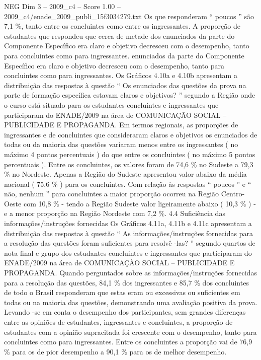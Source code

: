 \begin{textsample}{NEG Dim 3 – 2009\_c4 – Score 1.00 – 2009\_c4/enade\_2009\_publi\_15f3034279.txt}
Os que responderam “ poucos ” são 7,1 \%, tanto entre os concluintes como entre os ingressantes.
A proporção de estudantes que respondeu que cerca de metade dos enunciados da parte do Componente Específico era claro e objetivo decresceu com o desempenho, tanto para concluintes como para ingressantes. enunciados da parte do Componente Específico era claro e objetivo decresceu com o desempenho, tanto para concluintes como para ingressantes.
Os Gráficos 4.10a e 4.10b apresentam a distribuição das respostas à questão “ Os enunciados das questões da prova na parte de formação específica estavam claros e objetivos? ” segundo a Região onde o curso está situado para os estudantes concluintes e ingressantes que participaram do ENADE/2009 na área de COMUNICAÇÃO SOCIAL – PUBLICIDADE E PROPAGANDA.
Em termos regionais, as proporções de ingressantes e de concluintes que consideraram claros e objetivos os enunciados de todas ou da maioria das questões variaram menos entre os ingressantes ( no máximo 4 pontos percentuais ) do que entre os concluintes ( no máximo 5 pontos percentuais ).
Entre os concluintes, os valores foram de 74,6 \% no Sudeste a 79,3 \% no Nordeste.
Apenas a Região do Sudeste apresentou valor abaixo da média nacional ( 75,6 \% ) para os concluintes.
Com relação às respostas “ poucos ” e “ não, nenhum ” para concluintes a maior proporção ocorreu na Região Centro-Oeste com 10,8 \% - tendo a Região Sudeste valor ligeiramente abaixo ( 10,3 \% ) - e a menor proporção na Região Nordeste com 7,2 \%. 4.4 Suficiência das informações/instruções fornecidas Os Gráficos 4.11a, 4.11b e 4.11c apresentam a distribuição das respostas à questão “ As informações/instruções fornecidas para a resolução das questões foram suficientes para resolvê -las? ” segundo quartos de nota final e grupo dos estudantes concluintes e ingressantes que participaram do ENADE/2009 na área de COMUNICAÇÃO SOCIAL – PUBLICIDADE E PROPAGANDA.
Quando perguntados sobre as informações/instruções fornecidas para a resolução das questões, 84,1 \% dos ingressantes e 85,7 \% dos concluintes de todo o Brasil responderam que estas eram ou excessivas ou suficientes em todas ou na maioria das questões, demonstrando uma avaliação positiva da prova.
Levando -se em conta o desempenho dos participantes, sem grandes diferenças entre as opiniões de estudantes, ingressantes e concluintes, a proporção de estudantes com a opinião supracitada foi crescente com o desempenho, tanto para concluintes como para ingressantes.
Entre os concluintes a proporção vai de 76,9 \% para os de pior desempenho a 90,1 \% para os de melhor desempenho.

\end{textsample}
